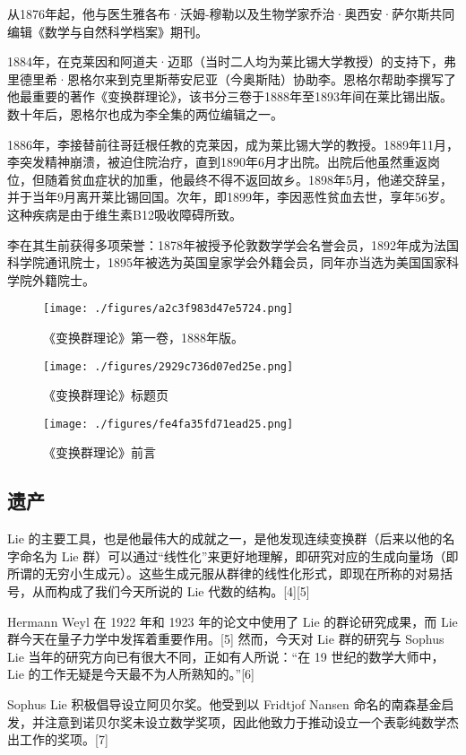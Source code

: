 从1876年起，他与医生雅各布·沃姆-穆勒以及生物学家乔治·奥西安·萨尔斯共同编辑《数学与自然科学档案》期刊。

1884年，在克莱因和阿道夫·迈耶（当时二人均为莱比锡大学教授）的支持下，弗里德里希·恩格尔来到克里斯蒂安尼亚（今奥斯陆）协助李。恩格尔帮助李撰写了他最重要的著作《变换群理论》，该书分三卷于1888年至1893年间在莱比锡出版。数十年后，恩格尔也成为李全集的两位编辑之一。

1886年，李接替前往哥廷根任教的克莱因，成为莱比锡大学的教授。1889年11月，李突发精神崩溃，被迫住院治疗，直到1890年6月才出院。出院后他虽然重返岗位，但随着贫血症状的加重，他最终不得不返回故乡。1898年5月，他递交辞呈，并于当年9月离开莱比锡回国。次年，即1899年，李因恶性贫血去世，享年56岁。这种疾病是由于维生素B12吸收障碍所致。

李在其生前获得多项荣誉：1878年被授予伦敦数学学会名誉会员，1892年成为法国科学院通讯院士，1895年被选为英国皇家学会外籍会员，同年亦当选为美国国家科学院外籍院士。
\begin{figure}[ht]
\centering
\texttt{[image: ./figures/a2c3f983d47e5724.png]}
\caption{《变换群理论》第一卷，1888年版。} \label{fig_SFSL_2}
\end{figure}
\begin{figure}[ht]
\centering
\texttt{[image: ./figures/2929c736d07ed25e.png]}
\caption{《变换群理论》标题页} \label{fig_SFSL_3}
\end{figure}
\begin{figure}[ht]
\centering
\texttt{[image: ./figures/fe4fa35fd71ead25.png]}
\caption{《变换群理论》前言} \label{fig_SFSL_4}
\end{figure}
\subsection{遗产}
Lie 的主要工具，也是他最伟大的成就之一，是他发现连续变换群（后来以他的名字命名为 Lie 群）可以通过“线性化”来更好地理解，即研究对应的生成向量场（即所谓的无穷小生成元）。这些生成元服从群律的线性化形式，即现在所称的对易括号，从而构成了我们今天所说的 Lie 代数的结构。[4][5]

Hermann Weyl 在 1922 年和 1923 年的论文中使用了 Lie 的群论研究成果，而 Lie 群今天在量子力学中发挥着重要作用。[5] 然而，今天对 Lie 群的研究与 Sophus Lie 当年的研究方向已有很大不同，正如有人所说：“在 19 世纪的数学大师中，Lie 的工作无疑是今天最不为人所熟知的。”[6]

Sophus Lie 积极倡导设立阿贝尔奖。他受到以 Fridtjof Nansen 命名的南森基金启发，并注意到诺贝尔奖未设立数学奖项，因此他致力于推动设立一个表彰纯数学杰出工作的奖项。[7]

